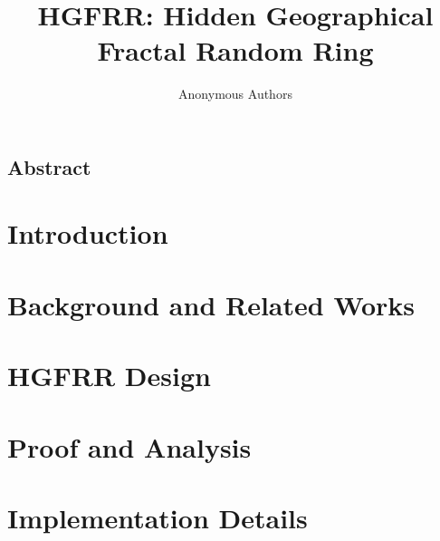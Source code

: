 \documentclass[letterpaper,twocolumn,10pt]{article}
\begin{document}
\date{}

\title{\Large \bf HGFRR: Hidden Geographical Fractal Random Ring}


\author{
{\rm Anonymous Authors}\\
}

\maketitle

\thispagestyle{empty}

\subsection*{Abstract}


\section{Introduction}


\section{Background and Related Works} \label{background}


\section{HGFRR Design} \label{design}


\section{Proof and Analysis} \label{analysis}


\section{Implementation Details} \label{implementation}

\end{document}
